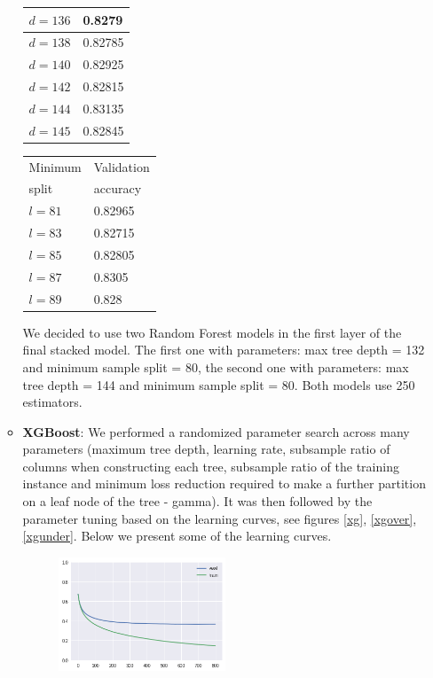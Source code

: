 \begin{itemize}
\begin{itemize}
\begin{table}[H]
\begin{minipage}[t]{.33\textwidth}
\begin{tabular}{|l|l|}
$d=136$            & 0.8279              \\ \hline
$d=138$            & 0.82785             \\ \hline
$d=140$            & 0.82925             \\ \hline
$d=142$            & 0.82815             \\ \hline
$d=144$            & 0.83135             \\ \hline
$d=145$            & 0.82845             \\ \hline
\end{tabular}
\end{minipage}%
\begin{minipage}[t]{.33\textwidth}
\begin{tabular}{|l|l|}
\hline
Minimum     & Validation  \\
split       & accuracy \\ \hline
$l=81$            & 0.82965             \\ \hline
$l=83$            & 0.82715             \\ \hline
$l=85$            & 0.82805              \\ \hline
$l=87$            & 0.8305              \\ \hline
$l=89$            & 0.828             \\ \hline
\end{tabular}
\end{minipage}
\end{table}
We decided to use two Random Forest models in the first layer of the final stacked model. The first one with parameters: max tree depth = 132 and minimum sample split = 80, the second one with parameters: max tree depth = 144 and minimum sample split = 80. Both models use 250 estimators.
    \item \textbf{XGBoost}: We performed a randomized parameter search across many parameters (maximum tree depth, learning rate, subsample ratio of columns when constructing each tree, subsample ratio of the training instance and minimum loss reduction required to make a further partition on a leaf node of the tree - gamma). It was then followed by the parameter tuning based on the learning curves, see figures \ref{xg}, \ref{xgover}, \ref{xgunder}.
    Below we present some of the learning curves.
    \begin{figure}[H]
    \centering
    \includegraphics[width=0.5\textwidth]{xgboost}

\end{figure}
\end{itemize}
\end{itemize}
